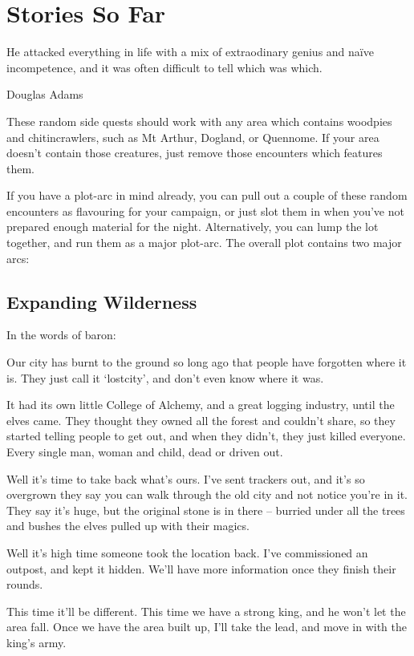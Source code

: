 \chapter{Stories So Far}
	\epigraph{He attacked everything in life with a mix of extraodinary genius and na\"ive incompetence, and it was often difficult to tell which was which.}{Douglas Adams}

These random side quests should work with any area which contains woodpies and chitincrawlers, such as Mt Arthur, Dogland, or Quennome.
If your area doesn't contain those creatures, just remove those encounters which features them.

If you have a plot-arc in mind already, you can pull out a couple of these random encounters as flavouring for your campaign, or just slot them in when you've not prepared enough material for the night.  Alternatively, you can lump the lot together, and run them as a major plot-arc.  The overall plot contains two major arcs:

\section{Expanding Wilderness}

In the words of \gls{baron}:

\begin{speechtext}

	Our city has burnt to the ground so long ago that people have forgotten where it is.
	They just call it `\gls{lostcity}', and don't even know where it was.

	It had its own little College of Alchemy, and a great logging industry, until the elves came.  They thought they owned all the forest and couldn't share, so they started telling people to get out, and when they didn't, they just killed everyone.  Every single man, woman and child, dead or driven out.

	Well it's time to take back what's ours.  I've sent trackers out, and it's so overgrown they say you can walk through the old city and not notice you're in it.  They say it's huge, but the original stone is in there -- burried under all the trees and bushes the elves pulled up with their magics.

	Well it's high time someone took the location back.
	I've commissioned an outpost, and kept it hidden.
	We'll have more information once they finish their rounds.

	This time it'll be different.  This time we have a strong king, and he won't let the area fall.  Once we have the area built up, I'll take the lead, and move in with the king's army.

\end{speechtext}

